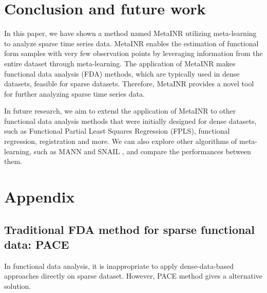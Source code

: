 \documentclass{article}
\begin{document}
\section{Conclusion and future work}
In this paper, we have shown a method named MetaINR utilizing meta-learning to analyze sparse time series data. 
MetaINR enables the estimation of functional form samples with very few observation points by leveraging information from the entire dataset through meta-learning. 
The application of MetaINR makes functional data analysis (FDA) methods, which are typically used in dense datasets, feasible for sparse datasets. 
Therefore, MetaINR provides a novel tool for further analyzing sparse time series data.

In future research, we aim to extend the application of MetaINR to other functional data analysis methods that were initially designed for dense datasets, such as Functional Partial Least Squares Regression (FPLS), functional regression, registration and more.
We can also explore other algorithms of meta-learning, such as MANN \cite{santoro2016meta} and SNAIL \cite{mishra2017simple}, and compare the performances between them.
\section{Appendix}

\subsection{Traditional FDA method for sparse functional data: PACE \cite{yao2005functional}} 
In functional data analysis, it is inappropriate to apply dense-data-based approaches directly on sparse dataset.
However, PACE method gives a alternative solution.
\end{document}
